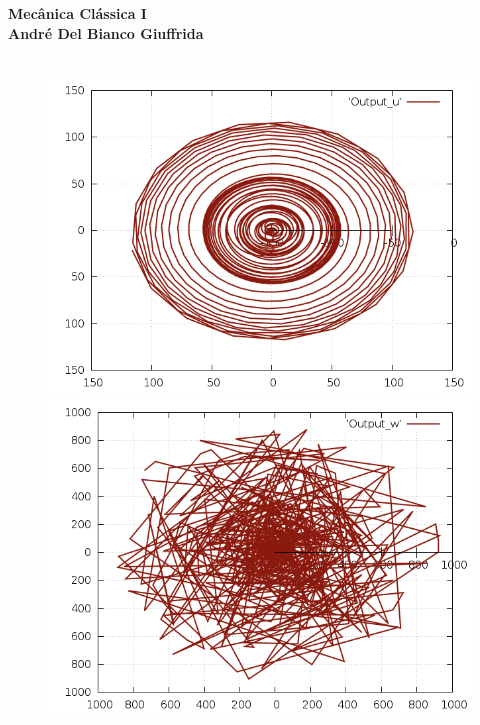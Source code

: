 \documentclass[a4paper,12pt]{exam}
\begin{document}
\begingroup 
	  \bf \Large Mecânica Clássica I\\
	  \indent \normalsize André Del Bianco Giuffrida
	\endgroup
	\\ \quad
	\\
	\begin{figure}[h]
			\centering
			\includegraphics[scale=0.5]{5o0.png}
			\includegraphics[scale=0.5]{5o1.png}
		\end{figure}

		
	
\end{document}
